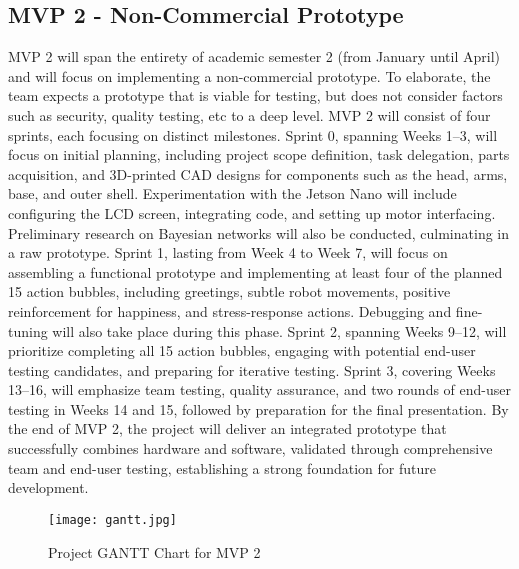 \subsection{MVP 2 - Non-Commercial Prototype}
MVP 2 will span the entirety of academic semester 2 (from January until April) and will focus on implementing a non-commercial prototype. To elaborate, the team expects a prototype that is viable for testing, but does not consider factors such as security, quality testing, etc to a deep level. MVP 2 will consist of four sprints, each focusing on distinct milestones. Sprint 0, spanning Weeks 1–3, will focus on initial planning, including project scope definition, task delegation, parts acquisition, and 3D-printed CAD designs for components such as the head, arms, base, and outer shell. Experimentation with the Jetson Nano will include configuring the LCD screen, integrating code, and setting up motor interfacing. Preliminary research on Bayesian networks will also be conducted, culminating in a raw prototype. Sprint 1, lasting from Week 4 to Week 7, will focus on assembling a functional prototype and implementing at least four of the planned 15 action bubbles, including greetings, subtle robot movements, positive reinforcement for happiness, and stress-response actions. Debugging and fine-tuning will also take place during this phase. Sprint 2, spanning Weeks 9–12, will prioritize completing all 15 action bubbles, engaging with potential end-user testing candidates, and preparing for iterative testing. Sprint 3, covering Weeks 13–16, will emphasize team testing, quality assurance, and two rounds of end-user testing in Weeks 14 and 15, followed by preparation for the final presentation. By the end of MVP 2, the project will deliver an integrated prototype that successfully combines hardware and software, validated through comprehensive team and end-user testing, establishing a strong foundation for future development.

\begin{figure}[!ht]
      \centering
      \texttt{[image: gantt.jpg]}
      \caption{Project GANTT Chart for MVP 2}
      \label{fig:gantt}
\end{figure}

